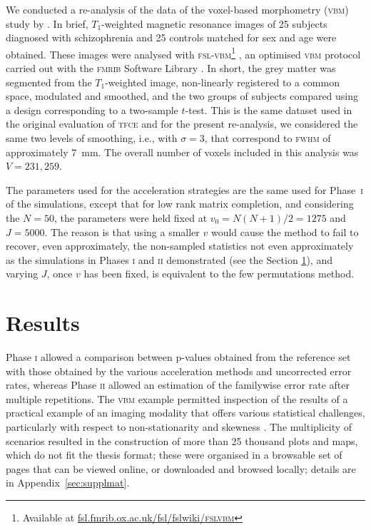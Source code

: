 We conducted a re-analysis of the data of the voxel-based morphometry (\textsc{vbm}) study by \citet{Douaud2007}. In brief, $T_1$-weighted magnetic resonance images of 25 subjects diagnosed with schizophrenia and 25 controls matched for sex and age were obtained. These images were analysed with \textsc{fsl-vbm}\footnote{Available at \href{http://fsl.fmrib.ox.ac.uk/fsl/fslwiki/FSLVBM}{fsl.fmrib.ox.ac.uk/fsl/fslwiki/\textsc{fslvbm}}} \citep{Douaud2007}, an optimised \textsc{vbm} protocol \citep{Good2001} carried out with the \textsc{fmrib} Software Library \citep[\textsc{fsl;}][]{Smith2004}. In short, the grey matter was segmented from the $T_1$-weighted image, non-linearly registered to a common space, modulated and smoothed, and the two groups of subjects compared using a design corresponding to a two-sample $t$-test. This is the same dataset used in the original evaluation of \textsc{tfce} \citep{Smith2009} and for the present re-analysis, we considered the same two levels of smoothing, i.e., with $\sigma=3$, that correspond to \textsc{fwhm} of approximately 7~mm. The overall number of voxels included in this analysis was $V = 231,259$.

The parameters used for the acceleration strategies are the same used for Phase~\textsc{i} of the simulations, except that for low rank matrix completion, and considering the $N=50$, the parameters were held fixed at $v_0=N(N+1)/2=1275$ and $J=5000$. The reason is that using a smaller $v$ would cause the method to fail to recover, even approximately, the non-sampled statistics not even approximately as the simulations in Phases \textsc{i} and \textsc{ii} demonstrated (see the Section \ref{sec:accel:results}), and varying $J$, once $v$ has been fixed, is equivalent to the few permutations method.

\section{Results}
\label{sec:accel:results}

Phase \textsc{i} allowed a comparison between p-values obtained from the reference set with those obtained by the various acceleration methods and uncorrected error rates, whereas Phase \textsc{ii} allowed an estimation of the familywise error rate after multiple repetitions. The \textsc{vbm} example permitted inspection of the results of a practical example of an imaging modality that offers various statistical challenges, particularly with respect to non-stationarity \citep{Hayasaka2004, Salimi-Khorshidi2011} and skewness \citep{Salmond2002, Viviani2007}. The multiplicity of scenarios resulted in the construction of more than 25 thousand plots and maps, which do not fit the thesis format; these were organised in a browsable set of pages that can be viewed online, or downloaded and browsed locally; details are in Appendix~\ref{sec:supplmat}.

